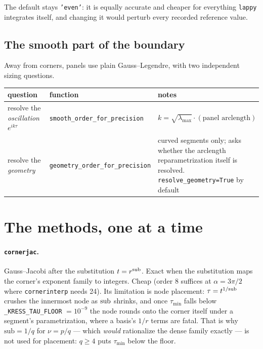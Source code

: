 \documentclass[11pt]{article}
\newcommand{\code}[1]{\texttt{#1}}
\begin{document}
The default stays \code{'even'}: it is equally accurate and cheaper for
everything \code{lappy} integrates itself, and changing it would perturb every
recorded reference value.

\subsection{The smooth part of the boundary}

Away from corners, panels use plain Gauss--Legendre, with two independent sizing
questions.

\begin{center}\small
\begin{tabularx}{\textwidth}{@{}l l L@{}}
\toprule
\textbf{question} & \textbf{function} & \textbf{notes} \\
\midrule
resolve the \emph{oscillation} $e^{ik\tau}$ & \code{smooth\_order\_for\_precision} &
  $k = \sqrt{\lambda_{\max}}\cdot(\text{panel arclength})$ \\
resolve the \emph{geometry} & \code{geometry\_order\_for\_precision} &
  curved segments only; asks whether the arclength reparametrization itself is
  resolved. \code{resolve\_geometry=True} by default \\
\bottomrule
\end{tabularx}
\end{center}

\section{The methods, one at a time}

\paragraph{\code{cornerjac}.} Gauss--Jacobi after the substitution $t = r^{\rm sub}$.
Exact when the substitution maps the corner's exponent family to integers. Cheap
(order 8 suffices at $\alpha = 3\pi/2$ where \code{cornerinterp} needs 24). Its
limitation is node placement: $\tau = t^{1/\rm sub}$ crushes the innermost node
as $\rm sub$ shrinks, and once $\tau_{\min}$ falls below
\code{\_KRESS\_TAU\_FLOOR} $= 10^{-9}$ the node rounds onto the corner itself
under a segment's parametrization, where a basis's $1/r$ terms are fatal. That is
why $\text{sub} = 1/q$ for $\nu = p/q$ --- which \emph{would} rationalize the
dense family exactly --- is not used for placement: $q \ge 4$ puts $\tau_{\min}$
below the floor.
\end{document}
